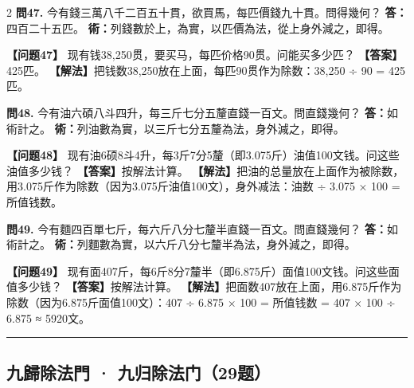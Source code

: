 \documentclass[11pt,a4paper]{article}
\newcommand{\longline}{\noindent\rule{\textwidth}{0.4pt}}
\begin{document}
\begin{paracol}{2}
\textbf{問47.} 今有錢三萬八千二百五十貫，欲買馬，每匹價錢九十貫。問得幾何？\break
\textbf{答：}四百二十五匹。\break
\textbf{術：}列錢數於上，為實，以匹價為法，從上身外減之，即得。

\switchcolumn

\textbf{【问题47】} 现有钱38,250贯，要买马，每匹价格90贯。问能买多少匹？\break
\textbf{【答案】}425匹。\break
\textbf{【解法】}把钱数38,250放在上面，每匹90贯作为除数：38,250 ÷ 90 = 425匹。

\switchcolumn*

\textbf{問48.} 今有油六碩八斗四升，每三斤七分五釐直錢一百文。問直錢幾何？\break
\textbf{答：}如術計之。\break
\textbf{術：}列油數為實，以三斤七分五釐為法，身外減之，即得。

\switchcolumn

\textbf{【问题48】} 现有油6硕8斗4升，每3斤7分5釐（即3.075斤）油值100文钱。问这些油值多少钱？\break
\textbf{【答案】}按解法计算。\break
\textbf{【解法】}把油的总量放在上面作为被除数，用3.075斤作为除数（因为3.075斤油值100文），身外减法：油数 ÷ 3.075 × 100 = 所值钱数。

\switchcolumn*

\textbf{問49.} 今有麵四百單七斤，每六斤八分七釐半直錢一百文。問直錢幾何？\break
\textbf{答：}如術計之。\break
\textbf{術：}列麵數為實，以六斤八分七釐半為法，身外減之，即得。

\switchcolumn

\textbf{【问题49】} 现有面407斤，每6斤8分7釐半（即6.875斤）面值100文钱。问这些面值多少钱？\break
\textbf{【答案】}按解法计算。\break
\textbf{【解法】}把面数407放在上面，用6.875斤作为除数（因为6.875斤面值100文）：407 ÷ 6.875 × 100 = 所值钱数 = 407 × 100 ÷ 6.875 ≈ 5920文。

\end{paracol}

\longline

\subsection{九歸除法門 · 九归除法门（29题）}
\label{sec:jiugui}
\end{document}
